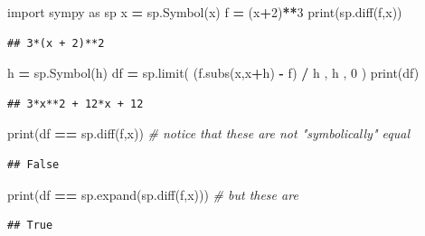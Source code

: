 \documentclass[
]{book}
\newenvironment{Shaded}{\begin{snugshade}}{\end{snugshade}}
\newcommand{\BuiltInTok}[1]{#1}
\newcommand{\CommentTok}[1]{\textcolor[rgb]{0.56,0.35,0.01}{\textit{#1}}}
\newcommand{\DecValTok}[1]{\textcolor[rgb]{0.00,0.00,0.81}{#1}}
\newcommand{\ImportTok}[1]{#1}
\newcommand{\NormalTok}[1]{#1}
\newcommand{\OperatorTok}[1]{\textcolor[rgb]{0.81,0.36,0.00}{\textbf{#1}}}
\newcommand{\StringTok}[1]{\textcolor[rgb]{0.31,0.60,0.02}{#1}}
\theoremstyle{definition}
\theoremstyle{definition}
\theoremstyle{definition}
\theoremstyle{remark}
\begin{document}
\begin{Shaded}
\begin{Highlighting}[]
\ImportTok{import}\NormalTok{ sympy }\ImportTok{as}\NormalTok{ sp}
\NormalTok{x }\OperatorTok{=}\NormalTok{ sp.Symbol(}\StringTok{\textquotesingle{}x\textquotesingle{}}\NormalTok{)}
\NormalTok{f }\OperatorTok{=}\NormalTok{ (x}\OperatorTok{+}\DecValTok{2}\NormalTok{)}\OperatorTok{**}\DecValTok{3}
\BuiltInTok{print}\NormalTok{(sp.diff(f,x))}
\end{Highlighting}
\end{Shaded}

\begin{verbatim}
## 3*(x + 2)**2
\end{verbatim}

\begin{Shaded}
\begin{Highlighting}[]
\NormalTok{h }\OperatorTok{=}\NormalTok{ sp.Symbol(}\StringTok{\textquotesingle{}h\textquotesingle{}}\NormalTok{)}
\NormalTok{df }\OperatorTok{=}\NormalTok{ sp.limit( (f.subs(x,x}\OperatorTok{+}\NormalTok{h) }\OperatorTok{{-}}\NormalTok{ f) }\OperatorTok{/}\NormalTok{ h , h , }\DecValTok{0}\NormalTok{ )}
\BuiltInTok{print}\NormalTok{(df)}
\end{Highlighting}
\end{Shaded}

\begin{verbatim}
## 3*x**2 + 12*x + 12
\end{verbatim}

\begin{Shaded}
\begin{Highlighting}[]
\BuiltInTok{print}\NormalTok{(df }\OperatorTok{==}\NormalTok{ sp.diff(f,x)) }\CommentTok{\# notice that these are not "symbolically" equal}
\end{Highlighting}
\end{Shaded}

\begin{verbatim}
## False
\end{verbatim}

\begin{Shaded}
\begin{Highlighting}[]
\BuiltInTok{print}\NormalTok{(df }\OperatorTok{==}\NormalTok{ sp.expand(sp.diff(f,x))) }\CommentTok{\# but these are}
\end{Highlighting}
\end{Shaded}

\begin{verbatim}
## True
\end{verbatim}
\end{document}
